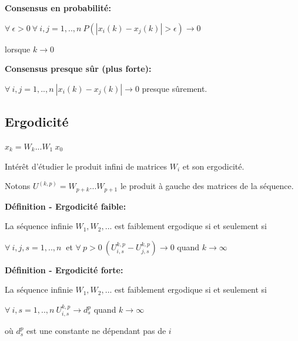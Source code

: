 \documentclass{beamer}
\begin{document}
\begin{frame}
	\textbf{Consensus en probabilité:}
	
	$\forall\ \epsilon > 0\ \forall\ i,j = 1,..,n\ P(|x_i(k) - x_j(k)| > \epsilon) \rightarrow 0$
	
	lorsque $k \rightarrow 0$
	
	\bigbreak
	
	\pause
	
	
	\textbf{Consensus presque sûr (plus forte):}
	
	$\forall\ i,j = 1,..,n\ |x_i(k) - x_j(k)|\rightarrow 0$ presque sûrement.
\end{frame}

\subsection{Ergodicité}
\begin{frame}
	$x_k = W_k ... W_1\ x_0$
	
	\bigbreak
	
	Intérêt d'étudier le produit infini de matrices $W_i$ et son ergodicité.
	
	\bigbreak
		
	Notons $U^{(k, p)} = W_{p+k}...W_{p+1}$ le produit à gauche des matrices de la séquence.
\end{frame}

\begin{frame}
	\textbf{Définition - Ergodicité faible:}
	
	La séquence infinie $W_1, W_2, ...$ est faiblement ergodique si et seulement si
	
	$ \forall\ i, j, s = 1,..,n\ $ et $\forall\ p > 0\ (U_{i,s}^{k,p} - U_{j,s}^{k,p}) \rightarrow 0$ quand $k \rightarrow \infty$
	
	\bigbreak

	
	\textbf{Définition - Ergodicité forte:}
	
	La séquence infinie $W_1, W_2, ...$ est faiblement ergodique si et seulement si
	
	$ \forall\ i, s = 1,..,n\ U_{i,s}^{k,p} \rightarrow d_s^p$ quand $k \rightarrow \infty$
	
	où $d_s^p$ est une constante ne dépendant pas de $i$
	\\
	\vspace{1cm}
	
\end{frame}
\end{document}

